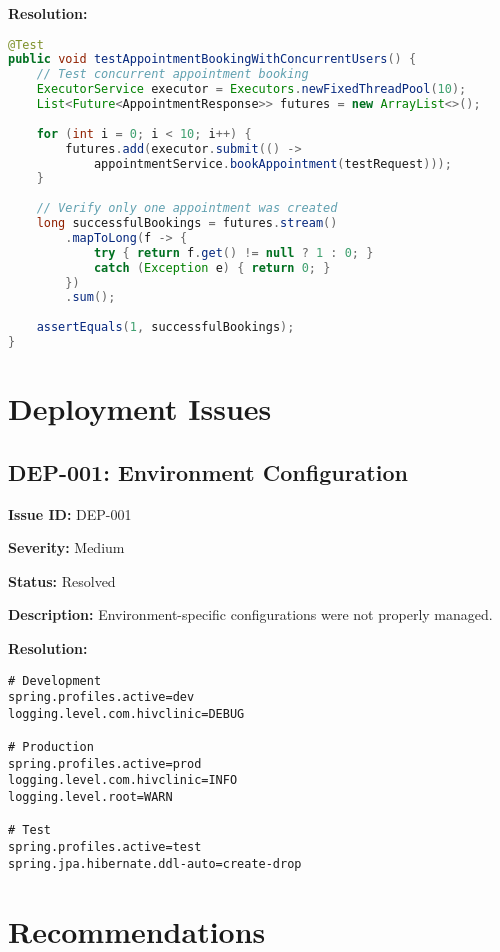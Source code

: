 \documentclass[12pt,a4paper]{article}
\begin{document}
\textbf{Resolution:}
\begin{lstlisting}[language=Java, caption=Test Coverage Improvement]
@Test
public void testAppointmentBookingWithConcurrentUsers() {
    // Test concurrent appointment booking
    ExecutorService executor = Executors.newFixedThreadPool(10);
    List<Future<AppointmentResponse>> futures = new ArrayList<>();
    
    for (int i = 0; i < 10; i++) {
        futures.add(executor.submit(() -> 
            appointmentService.bookAppointment(testRequest)));
    }
    
    // Verify only one appointment was created
    long successfulBookings = futures.stream()
        .mapToLong(f -> {
            try { return f.get() != null ? 1 : 0; }
            catch (Exception e) { return 0; }
        })
        .sum();
    
    assertEquals(1, successfulBookings);
}
\end{lstlisting}

\section{Deployment Issues}

\subsection{DEP-001: Environment Configuration}

\textbf{Issue ID:} DEP-001

\textbf{Severity:} Medium

\textbf{Status:} Resolved

\textbf{Description:} Environment-specific configurations were not properly managed.

\textbf{Resolution:}
\begin{lstlisting}[language=properties, caption=Environment Configuration]
# Development
spring.profiles.active=dev
logging.level.com.hivclinic=DEBUG

# Production
spring.profiles.active=prod
logging.level.com.hivclinic=INFO
logging.level.root=WARN

# Test
spring.profiles.active=test
spring.jpa.hibernate.ddl-auto=create-drop
\end{lstlisting}

\section{Recommendations}
\end{document}
